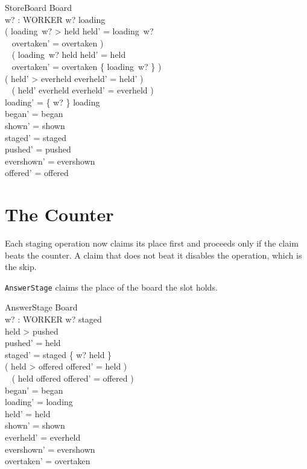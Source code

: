 \documentclass[a4paper,10pt,fleqn]{article}
\begin{document}
\begin{schema}{StoreBoard}
  \Delta Board \\
  w? : WORKER
\where
  w? \in \dom loading \\
  ( loading~w? > held \land held' = loading~w? \\
  \quad~ \land overtaken' = overtaken ) \lor \\
  \quad~ ( loading~w? \leq held \land held' = held \\
  \quad~ \land overtaken' = overtaken \cup \{ loading~w? \} ) \\
  ( held' > everheld \land everheld' = held' ) \lor \\
  \quad~ ( held' \leq everheld \land everheld' = everheld ) \\
  loading' = \{ w? \} \ndres loading \\
  began' = began \\
  shown' = shown \\
  staged' = staged \\
  pushed' = pushed \\
  evershown' = evershown \\
  offered' = offered
\end{schema}

\section{The Counter}

Each staging operation now claims its place first and proceeds only if the
claim beats the counter. A claim that does not beat it disables the operation,
which is the skip.

\texttt{AnswerStage} claims the place of the board the slot holds.

\begin{schema}{AnswerStage}
  \Delta Board \\
  w? : WORKER
\where
  w? \notin \dom staged \\
  held > pushed \\
  pushed' = held \\
  staged' = staged \cup \{ w? \mapsto held \} \\
  ( held > offered \land offered' = held ) \lor \\
  \quad~ ( held \leq offered \land offered' = offered ) \\
  began' = began \\
  loading' = loading \\
  held' = held \\
  shown' = shown \\
  everheld' = everheld \\
  evershown' = evershown \\
  overtaken' = overtaken
\end{schema}
\end{document}
